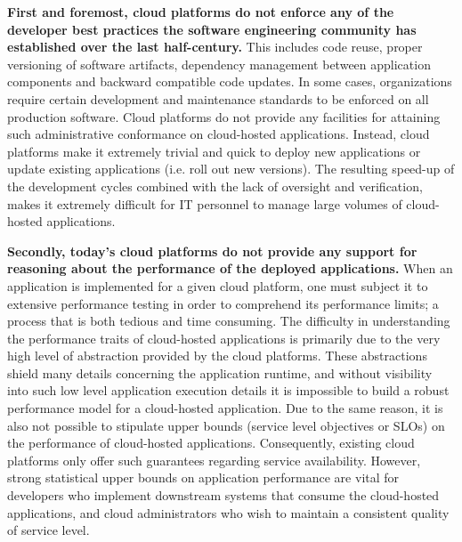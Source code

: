 \textbf{First and foremost, cloud platforms do not enforce any of the developer best practices
the software engineering community has established over the last half-century.} This
includes code reuse, proper versioning of software artifacts, dependency management
between application components and backward compatible code updates. In
some cases, organizations require certain development and maintenance standards to be enforced on
all production software. Cloud platforms do not provide any facilities for attaining
such administrative conformance on cloud-hosted applications. Instead, cloud platforms
make it extremely trivial and quick to deploy new applications or update existing
applications (i.e. roll out new versions). The resulting speed-up of the development cycles combined with the lack of 
oversight and verification, makes it extremely difficult for 
IT personnel to manage large volumes of cloud-hosted applications.

\textbf{Secondly, today's cloud platforms do not provide any support for reasoning about the 
performance of the deployed applications.} When an application is implemented for
a given cloud platform, one must subject it to extensive performance testing in order
to comprehend its performance limits; a process that is both 
tedious and time consuming. The difficulty in understanding the performance 
traits of cloud-hosted applications is primarily due to the very high level of 
abstraction provided by the cloud platforms. These abstractions shield many details 
concerning the application runtime, and without visibility into such low level application 
execution details it is impossible
to build a robust performance model for a cloud-hosted application. Due to the same
reason, it is also not possible to stipulate upper bounds (service level objectives or SLOs) on
the performance of cloud-hosted applications. 
Consequently, existing cloud platforms only offer such guarantees regarding service availability.
However, strong statistical upper bounds on application performance are vital for developers 
who implement downstream systems that consume the cloud-hosted applications,
and cloud administrators who wish to maintain a consistent quality of service
level.

